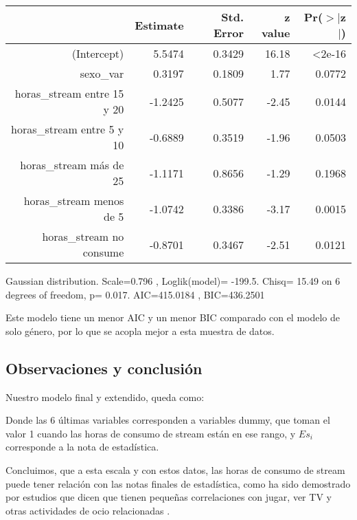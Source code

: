 \documentclass[11pt]{article}
\begin{document}
\begin{center}
\begin{table}[ht]
\centering
\begin{tabular}{rrrrr}
 \hline
& Estimate & Std. Error & z value & Pr($>$$|$z$|$) \\
 \hline
(Intercept)                & 5.5474    & 0.3429& 16.18& <2e-16\\
sexo\_var                  & 0.3197 &    0.1809  & 1.77& 0.0772\\
horas\_stream entre 15 y 20 &-1.2425    & 0.5077 &-2.45& 0.0144\\
horas\_stream entre 5 y 10 & -0.6889   &  0.3519 &-1.96& 0.0503\\
horas\_stream más de 25   &  -1.1171    & 0.8656& -1.29& 0.1968\\
horas\_stream menos de 5   & -1.0742    & 0.3386& -3.17& 0.0015\\
horas\_stream no consume   & -0.8701    & 0.3467 &-2.51& 0.0121\\
    \hline
   \end{tabular}
   \end{table}
\tiny{Gaussian distribution. Scale=0.796 , Loglik(model)= -199.5. Chisq= 15.49 on 6 degrees of freedom, p= 0.017. AIC=415.0184 , BIC=436.2501 }
\end{center}   

Este modelo tiene un menor AIC y un menor BIC comparado con el modelo de solo género, por lo que se acopla mejor a esta muestra de datos.


\subsection{Observaciones y conclusión}

Nuestro modelo final y extendido, queda como:

\begin{center}


\end{center}

Donde las 6 últimas variables corresponden a variables dummy, que toman el valor 1 cuando las horas de consumo de stream están en ese rango, y \(Es_i\) corresponde a la nota de estadística.

Concluimos, que a esta escala y con estos datos, las horas de consumo de stream puede tener relación con las notas finales de estadística, como ha sido demostrado por estudios que dicen que tienen pequeñas correlaciones con jugar, ver TV y otras actividades de ocio relacionadas .
\end{document}
